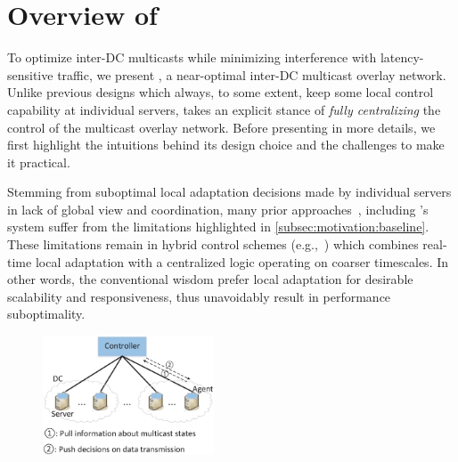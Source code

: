 \section{Overview of \name}
\label{sec:overview}

To optimize inter-DC multicasts while minimizing
interference with latency-sensitive traffic, we present {\em \name},
a near-optimal inter-DC multicast overlay network.
Unlike previous designs which always, to some extent, keep
some local control capability at individual servers,
\name takes an explicit stance of {\em fully centralizing} the
control of the multicast overlay network.
Before presenting \name in more details,
we first highlight the intuitions behind its design
choice and the challenges to make it practical.







Stemming from suboptimal local adaptation decisions made by individual servers in lack of global view and coordination, many prior approaches~\cite{Andreev2013Designing,Repantis2010Scaling,Huang2014A}, including \company's system suffer from the limitations highlighted in \Section\ref{subsec:motivation:baseline}. These limitations remain in hybrid control schemes (e.g.,~\cite{yin2009design,mukerjee2014enabling}) which combines real-time local adaptation with a centralized logic operating on coarser timescales. In other words, the conventional wisdom prefer local adaptation for desirable scalability and responsiveness, thus unavoidably result in performance suboptimality.

\begin{figure}[t]
  \centering
  \includegraphics[width=2in]{images/framework.eps}
  \label{fig:framework}
\vspace{-0.4cm}
\end{figure}

